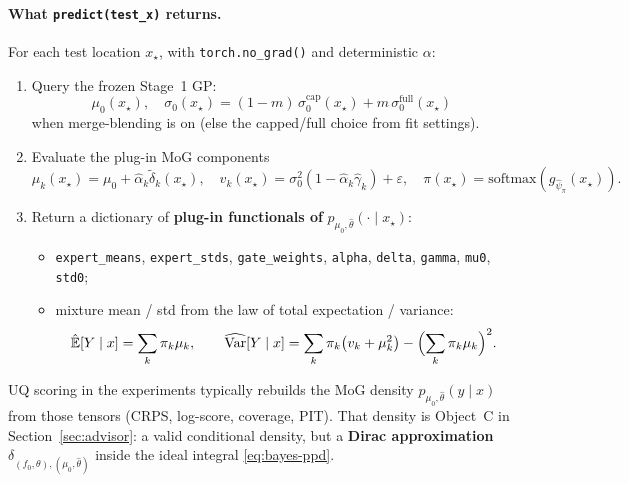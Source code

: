 \documentclass[11pt,a4paper]{article}
\theoremstyle{plain}
\theoremstyle{definition}
\theoremstyle{remark}
\newcommand{\tht}{\theta}
\begin{document}
\paragraph{What \texttt{predict(test\_x)} returns.}
For each test location \(x_\star\), with \texttt{torch.no\_grad()} and deterministic
\(\alpha\):
\begin{enumerate}[leftmargin=1.3em,itemsep=0.2em]
  \item Query the frozen Stage~1 GP:
        \[
          \mu_0(x_\star),
          \quad
          \sigma_0(x_\star)
          =
          (1-m)\,\sigma_0^{\mathrm{cap}}(x_\star)
          +
          m\,\sigma_0^{\mathrm{full}}(x_\star)
        \]
        when merge-blending is on (else the capped/full choice from fit settings).
  \item Evaluate the plug-in MoG components
        \[
          \mu_k(x_\star)=\mu_0+\hat\alpha_k\tilde\delta_k(x_\star),
          \quad
          v_k(x_\star)=\sigma_0^2(1-\hat\alpha_k\hat\gamma_k)+\varepsilon,
          \quad
          \pi(x_\star)=\mathrm{softmax}(g_{\hat\psi_\pi}(x_\star)).
        \]
  \item Return a dictionary of \textbf{plug-in functionals of}
        \(p_{\mu_0,\hat\tht}(\cdot\mid x_\star)\):
        \begin{itemize}[leftmargin=1.1em]
          \item \texttt{expert\_means}, \texttt{expert\_stds}, \texttt{gate\_weights},
                \texttt{alpha}, \texttt{delta}, \texttt{gamma}, \texttt{mu0}, \texttt{std0};
          \item mixture mean / std from the law of total expectation / variance:
                \[
                  \hat{\mathbb E}[Y\mid x]
                  =
                  \sum_k\pi_k\mu_k,
                  \qquad
                  \widehat{\mathrm{Var}}[Y\mid x]
                  =
                  \sum_k\pi_k\bigl(v_k+\mu_k^2\bigr)
                  -
                  \Bigl(\sum_k\pi_k\mu_k\Bigr)^2.
                \]
        \end{itemize}
\end{enumerate}
UQ scoring in the experiments typically rebuilds the MoG density
\(p_{\mu_0,\hat\tht}(y\mid x)\) from those tensors (CRPS, log-score, coverage, PIT).
That density is Object~C in Section~\ref{sec:advisor}: a valid conditional density,
but a \textbf{Dirac approximation}
\(\delta_{(f_0,\tht),(\mu_0,\hat\tht)}\) inside the ideal integral
\eqref{eq:bayes-ppd}.
\end{document}
